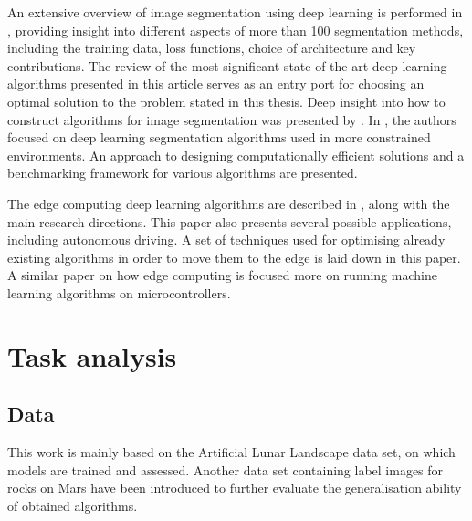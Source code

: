 \documentclass[a4paper,twoside,12pt]{book}
\begin{document}
An extensive overview of image segmentation using deep learning is performed in \cite{minaee2021image}, providing insight into different aspects of more than 100 segmentation methods, including the training data, loss functions, choice of architecture and key contributions. The review of the most significant state-of-the-art deep learning algorithms presented in this article serves as an entry port for choosing an optimal solution to the problem stated in this thesis. Deep insight into how to construct algorithms for image segmentation was presented by \cite{ghosh2019understanding}. In \cite{siam2018comparative}, the authors focused on deep learning segmentation algorithms used in more constrained environments. An approach to designing computationally efficient solutions and a benchmarking framework for various algorithms are presented.

The edge computing deep learning algorithms are described in \cite{vestias2020moving}, along with the main research directions. This paper also presents several possible applications, including autonomous driving. A set of techniques used for optimising already existing algorithms in order to move them to the edge is laid down in this paper. A similar paper on how edge computing is \cite{merenda2020edge} focused more on running machine learning algorithms on microcontrollers.



\chapter{Task analysis}

\section{Data}
This work is mainly based on the Artificial Lunar Landscape data set, on which models are trained and assessed. Another data set containing label images for rocks on Mars have been introduced to further evaluate the generalisation ability of obtained algorithms.
\end{document}
